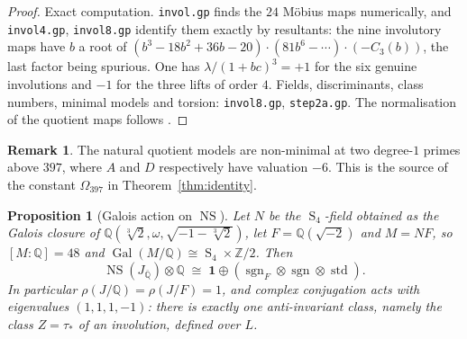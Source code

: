 \documentclass[11pt,reqno]{amsart}
\theoremstyle{plain}
\newtheorem{proposition}[theorem]{Proposition}
\theoremstyle{definition}
\newtheorem{remark}[theorem]{Remark}
\newcommand{\Q}{\mathbb{Q}}
\newcommand{\Z}{\mathbb{Z}}
\newcommand{\Qbar}{\overline{\Q}}
\DeclareMathOperator{\NS}{NS}
\DeclareMathOperator{\Gal}{Gal}
\DeclareMathOperator{\sgn}{sgn}
\DeclareMathOperator{\stdrep}{std}
\DeclareMathOperator{\Sym}{S}
\numberwithin{equation}{section}
\begin{document}
\begin{proof}
Exact computation. \texttt{invol.gp} finds the $24$ M\"obius maps numerically,
and \texttt{invol4.gp}, \texttt{invol8.gp} identify them exactly by resultants:
the nine involutory maps have $b$ a root of
$(b^{3}-18b^{2}+36b-20)\cdot(81b^{6}-\cdots)\cdot(-C_{3}(b))$, the last factor
being spurious. One has $\lambda/(1+bc)^{3}=+1$ for the six genuine involutions
and $-1$ for the three lifts of order $4$. Fields, discriminants, class numbers,
minimal models and torsion: \texttt{invol8.gp}, \texttt{step2a.gp}. The
normalisation of the quotient maps follows \cite{BianchiPadurariu}.
\end{proof}

\begin{remark}
The natural quotient models are non-minimal at two degree-$1$ primes above
$397$, where $A$ and $D$ respectively have valuation $-6$. This is the source of
the constant $\Omega_{397}$ in Theorem~\ref{thm:identity}.
\end{remark}

\begin{proposition}[Galois action on $\NS$]\label{prop:NS}
Let $N$ be the $\Sym_{4}$-field obtained as the Galois closure of
$\Q(\sqrt[3]{2},\omega,\sqrt{-1-\sqrt[3]{2}})$, let $F=\Q(\sqrt{-2})$ and
$M=NF$, so $[M:\Q]=48$ and $\Gal(M/\Q)\cong\Sym_{4}\times\Z/2$. Then
\[
  \NS(J_{\Qbar})\otimes\Q\;\cong\;\mathbf{1}\oplus(\sgn_{F}\otimes\sgn\otimes\stdrep).
\]
In particular $\rho(J/\Q)=\rho(J/F)=1$, and complex conjugation acts with
eigenvalues $(1,1,1,-1)$: there is exactly one anti-invariant class, namely the
class $Z=\tau_{*}$ of an involution, defined over $L$.
\end{proposition}
\end{document}
